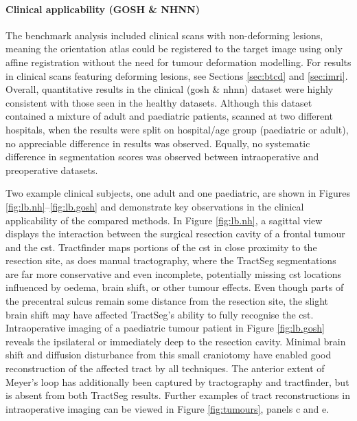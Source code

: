 \documentclass[12pt,phd,a4paper,twoside]{ucl_thesis}
\begin{document}
\paragraph*{Clinical applicability (GOSH \& NHNN)}

The benchmark analysis included clinical scans with non-deforming lesions, meaning the orientation atlas could be registered to the target image using only affine registration without the need for tumour deformation modelling.
For results in clinical scans featuring deforming lesions, see Sections \ref{sec:btcd} and \ref{sec:imri}. Overall, quantitative results in the clinical (\gls{gosh} \& \gls{nhnn}) dataset were highly consistent with those seen in the healthy datasets.
Although this dataset contained a mixture of adult and paediatric patients, scanned at two different hospitals, when the results were split on hospital/age group (paediatric or adult), no appreciable difference in results was observed.
Equally, no systematic difference in segmentation scores was observed between intraoperative and preoperative datasets.

Two example clinical subjects, one adult and one paediatric, are shown in Figures \ref{fig:lb.nh}--\ref{fig:lb.gosh} and demonstrate key observations in the clinical applicability of the compared methods.
In Figure \ref{fig:lb.nh}, a sagittal view displays the interaction between the surgical resection cavity of a frontal tumour and the \gls{cst}.
Tractfinder maps portions of the \gls{cst} in close proximity to the resection site, as does manual tractography, where the TractSeg segmentations are far more conservative and even incomplete, potentially missing \gls{cst} locations influenced by oedema, brain shift, or other tumour effects.
Even though parts of the precentral sulcus remain some distance from the resection site, the slight brain shift may have affected TractSeg's ability to fully recognise the \gls{cst}.
Intraoperative imaging of a paediatric tumour patient in Figure \ref{fig:lb.gosh} reveals the ipsilateral \gls{or} immediately deep to the resection cavity.
Minimal brain shift and diffusion disturbance from this small craniotomy have enabled good reconstruction of the affected tract by all techniques.
The anterior extent of Meyer's loop has additionally been captured by tractography and tractfinder, but is absent from both TractSeg results.
Further examples of tract reconstructions in intraoperative imaging can be viewed in Figure \ref{fig:tumours}, panels c and e.
\end{document}
